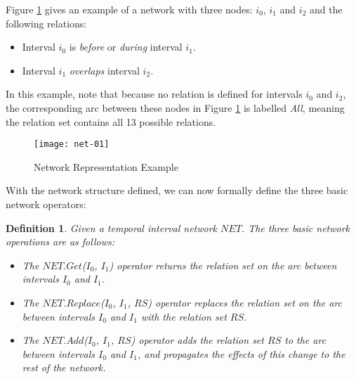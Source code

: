 \documentclass[11pt]{report}
\newtheorem{vdefinition}{Definition}[chapter]
\begin{document}
          Figure \ref{fig-net-ex-01} gives an example of a network with three
          nodes: $i_0$, $i_1$ and $i_2$ and the following relations:

          \begin{itemize}
            \item
              Interval ${i_0}$ is {\em before} or {\em during} interval
              ${i_1}$.
            \item
              Interval ${i_1}$ {\em overlaps} interval $i_2$.
          \end{itemize}

          In this example, note that because no relation is defined for
          intervals ${i_0}$ and ${i_2}$, the corresponding arc between these
          nodes in Figure \ref{fig-net-ex-01} is labelled {\em All}, meaning
          the relation set contains all 13 possible relations.

          \begin{figure}[tbhp]
            \begin{center}
              \texttt{[image: net-01]}
              \caption{Network Representation Example}
              \label{fig-net-ex-01}
            \end{center}
          \end{figure}

          With the network structure defined, we can now formally define the
          three basic network operators:

          \begin{vdefinition}
            \label{def-net-ops}
            Given a temporal interval network $NET$. The three basic network
            operations are as follows:

            \begin{itemize}
              \item
                The $NET.Get$($I_0$, $I_1$) operator returns the relation
                set on the arc between intervals $I_0$ and $I_1$.
              \item
                The $NET$.$Replace$($I_0$, $I_1$, $RS$) operator replaces the
                relation set on the arc between intervals $I_0$ and $I_1$ with
                the relation set $RS$.
              \item
                The $NET.Add$($I_0$, $I_1$, $RS$) operator adds the relation
                set $RS$ to the arc between intervals $I_0$ and $I_1$, and
                propagates the effects of this change to the rest of the
                network.
            \end{itemize}
          \end{vdefinition}
\end{document}

